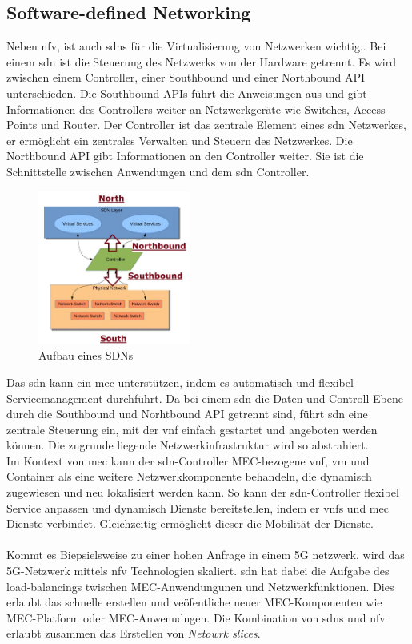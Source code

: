\documentclass[runningheads]{llncs}
\numberwithin{figure}{section}
\begin{document}
\subsection{Software-defined Networking}
\label{subsec:Software-defined Networking}
Neben \acrshort{nfv}, ist auch \acrlong{sdn}s für die Virtualisierung von Netzwerken wichtig..
Bei einem \acrshort{sdn} ist die Steuerung des Netzwerks von der Hardware getrennt. Es wird zwischen einem Controller, 
einer Southbound und einer Northbound API unterschieden. 
Die Southbound APIs führt die Anweisungen aus und gibt Informationen des Controllers weiter an Netzwerkgeräte wie Switches,
Access Points und Router. Der Controller ist das zentrale Element eines \acrshort{sdn} Netzwerkes, 
er ermöglicht ein zentrales Verwalten und Steuern des 
Netzwerkes. Die Northbound API gibt Informationen an den Controller weiter. Sie ist die Schnittstelle zwischen Anwendungen 
und dem \acrshort{sdn} Controller.\cite{SoftwareDefinedNetworkingSDN}
\begin{figure}
  \includegraphics[width=5cm]{images/SDN-Northbound-and-Southbound-Interfaces-Hong-2014.png}
  \caption{Aufbau eines SDNs}
  \label{fig:sdn}
\end{figure}
Das \acrlong{sdn} kann ein \acrshort{mec} unterstützen, indem es automatisch und flexibel Servicemanagement durchführt.
Da bei einem \acrshort{sdn} die Daten und Controll Ebene durch die Southbound und Norhtbound API getrennt sind, 
führt \acrshort{sdn} eine zentrale Steuerung ein, 
mit der \acrshort{vnf} einfach gestartet und angeboten werden können. 
Die zugrunde liegende Netzwerkinfrastruktur wird so abstrahiert. \\
Im Kontext von \acrshort{mec} kann der \acrshort{sdn}-Controller MEC-bezogene \acrshort{vnf}, 
\acrshort{vm} und Container als eine weitere Netzwerkkomponente behandeln, die dynamisch zugewiesen und neu lokalisiert werden kann.
So kann der \acrshort{sdn}-Controller flexibel Service anpassen und dynamisch Dienste bereitstellen, indem er \acrshort{vnf}s und  \acrshort{mec} Dienste verbindet.
Gleichzeitig  ermöglicht dieser die Mobilität der Dienste.
\\
\\
Kommt es Biepsielsweise zu einer hohen Anfrage in einem 5G netzwerk, wird das 5G-Netzwerk mittels \acrshort{nfv} Technologien skaliert.
\acrshort{sdn} hat dabei die Aufgabe des load-balancings twischen MEC-Anwendungunen und Netzwerkfunktionen. Dies erlaubt das 
schnelle erstellen und veöfentliche neuer MEC-Komponenten wie MEC-Platform oder MEC-Anwenudngen.
Die Kombination von \acrshort{sdn}s und \acrshort{nfv} erlaubt zusammen das Erstellen von \textit{Netowrk slices}. 
\end{document}
